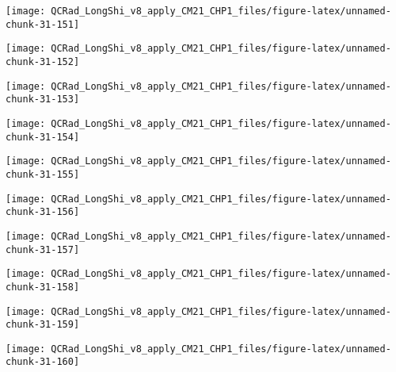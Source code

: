 \documentclass[
  10pt,
  a4paper,oneside]{article}
\begin{document}
\begin{center}\texttt{[image: QCRad\_LongShi\_v8\_apply\_CM21\_CHP1\_files/figure-latex/unnamed-chunk-31-151]} \end{center}

\begin{center}\texttt{[image: QCRad\_LongShi\_v8\_apply\_CM21\_CHP1\_files/figure-latex/unnamed-chunk-31-152]} \end{center}

\begin{center}\texttt{[image: QCRad\_LongShi\_v8\_apply\_CM21\_CHP1\_files/figure-latex/unnamed-chunk-31-153]} \end{center}

\begin{center}\texttt{[image: QCRad\_LongShi\_v8\_apply\_CM21\_CHP1\_files/figure-latex/unnamed-chunk-31-154]} \end{center}

\begin{center}\texttt{[image: QCRad\_LongShi\_v8\_apply\_CM21\_CHP1\_files/figure-latex/unnamed-chunk-31-155]} \end{center}

\begin{center}\texttt{[image: QCRad\_LongShi\_v8\_apply\_CM21\_CHP1\_files/figure-latex/unnamed-chunk-31-156]} \end{center}

\begin{center}\texttt{[image: QCRad\_LongShi\_v8\_apply\_CM21\_CHP1\_files/figure-latex/unnamed-chunk-31-157]} \end{center}

\begin{center}\texttt{[image: QCRad\_LongShi\_v8\_apply\_CM21\_CHP1\_files/figure-latex/unnamed-chunk-31-158]} \end{center}

\begin{center}\texttt{[image: QCRad\_LongShi\_v8\_apply\_CM21\_CHP1\_files/figure-latex/unnamed-chunk-31-159]} \end{center}

\begin{center}\texttt{[image: QCRad\_LongShi\_v8\_apply\_CM21\_CHP1\_files/figure-latex/unnamed-chunk-31-160]} \end{center}
\end{document}
